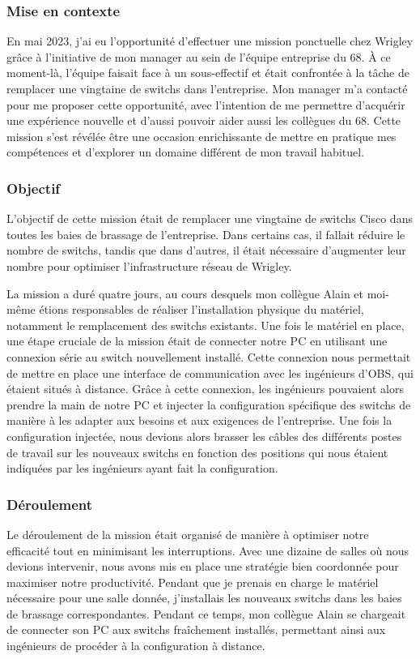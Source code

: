 \documentclass[12pt, a4paper]{article}
\begin{document}
\subsubsection{Mise en contexte}
En mai 2023, j'ai eu l'opportunité d'effectuer une mission
ponctuelle chez Wrigley grâce à l'initiative de mon manager au
sein de l'équipe entreprise du 68. À ce moment-là, l'équipe faisait
face à un sous-effectif et était confrontée à la tâche de remplacer
une vingtaine de switchs dans l'entreprise. Mon manager m'a
contacté pour me proposer cette opportunité, avec l'intention de
me permettre d'acquérir une expérience nouvelle et d'aussi
pouvoir aider aussi les collègues du 68. Cette mission
s'est révélée être une occasion enrichissante de mettre en pratique
mes compétences et d'explorer un domaine différent de mon travail habituel.

\subsubsection{Objectif}
L'objectif de cette mission était
de remplacer une vingtaine de switchs
Cisco dans toutes les baies de brassage de l'entreprise.
Dans certains cas, il fallait
réduire le nombre de switchs, tandis que dans d'autres, il
était nécessaire d'augmenter leur nombre pour optimiser
l'infrastructure réseau de Wrigley.

La mission a duré quatre jours, au cours desquels 
mon collègue Alain et moi-même étions responsables 
de réaliser l'installation physique
du matériel, notamment le remplacement des switchs existants.
Une fois le matériel en place, une étape cruciale de la mission
était de connecter notre PC en utilisant une connexion série au
switch nouvellement installé. Cette connexion nous
permettait de mettre en place une interface de communication
avec les ingénieurs d'\gls{OBS},
qui étaient situés à distance.
Grâce à cette connexion, les ingénieurs pouvaient alors prendre
la main de notre PC et injecter
la configuration spécifique des switchs de manière à les adapter
aux besoins et aux exigences de l'entreprise.
Une fois la configuration injectée, nous devions alors brasser 
les câbles des différents postes de travail sur les nouveaux switchs
en fonction des positions qui nous étaient indiquées par les
ingénieurs ayant fait la configuration.

\subsubsection{Déroulement}
Le déroulement de la mission était organisé de manière à optimiser
notre efficacité tout en minimisant les interruptions. Avec une
dizaine de salles où nous devions intervenir, nous avons mis en place une stratégie
bien coordonnée pour maximiser notre productivité. Pendant que je
prenais en charge le matériel nécessaire pour une salle donnée,
j'installais les nouveaux switchs dans les baies de brassage
correspondantes. Pendant ce temps, mon collègue Alain se chargeait
de connecter son PC aux switchs fraîchement installés, permettant
ainsi aux ingénieurs de procéder à la configuration à distance.
\end{document}
